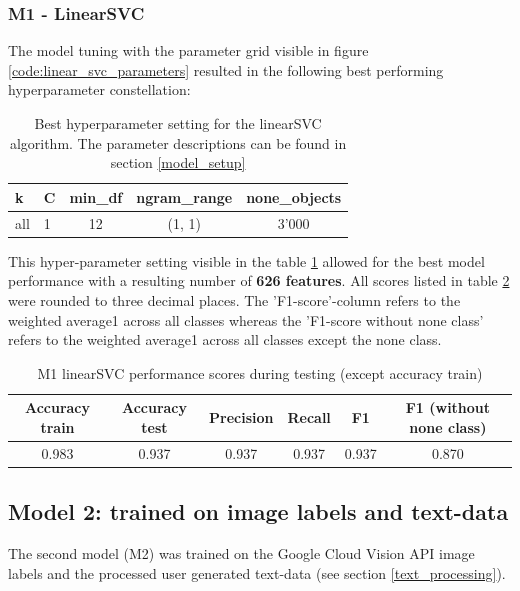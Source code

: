 \subsubsection{M1 - LinearSVC}
The model tuning with the parameter grid visible in figure \ref{code:linear_svc_parameters} resulted in the following best performing hyperparameter constellation:

\begin{table}[h!]
\begin{center}
\caption{Best hyperparameter setting for the linearSVC algorithm. The parameter descriptions can be found in section \ref{model_setup}}\vspace{1ex}
\label{tab:m1_linearSVC_bestParams}
\begin{tabular}{llccc}\hline
k & C & min\_df & ngram\_range & none\_objects \\ \hline
all & 1 & 12 & (1, 1) & 3'000 \\ \hline
\end{tabular}
\end{center}
\end{table}

This hyper-parameter setting visible in the table \ref{tab:m1_linearSVC_bestParams} allowed for the best model performance with a resulting number of \textbf{626 features}. All scores listed in table \ref{tab:m1_linearSVC_bestscores} were rounded to three decimal places. The 'F1-score'-column refers to the weighted average1 across all classes whereas the 'F1-score without none class' refers to the weighted average1 across all classes except the none class.

\begin{table}[h!]
\begin{center}
\caption{M1 linearSVC performance scores during testing (except accuracy train)}\vspace{1ex}
\label{tab:m1_linearSVC_bestscores}
\begin{tabular}{cccccc}\hline
Accuracy train & Accuracy test & Precision & Recall & F1 & F1 (without none class)\\ \hline
0.983 & 0.937 & 0.937 & 0.937 & 0.937 & 0.870 \\ \hline
\end{tabular}
\end{center}
\end{table}

\subsection{Model 2: trained on image labels and text-data}
The second model (M2) was trained on the Google Cloud Vision API image labels and the processed user generated text-data (see section \ref{text_processing}).

